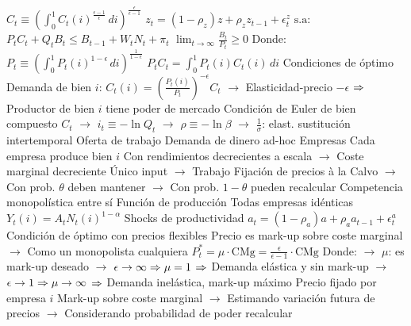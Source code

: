 \documentclass{nuevotema}
\begin{document}
\begin{esquemal}
				\4[] \quad \quad \quad $C_t \equiv \left( \int_0^1 C_t(i)^{\frac{\epsilon-1}{\epsilon}} \, di \right)^{\frac{\epsilon}{\epsilon-1}}$
				\4[] \quad \quad \quad $z_t = (1-\rho_z) z + \rho_z z_{t-1} + \epsilon_{t}^z$
				\4[] $\text{s.a:}$
				\4[] \quad \quad \quad $P_t C_t + Q_t B_t \leq B_{t-1} + W_t N_t + \pi_t$
				\4[] \quad \quad \quad $\lim_{t \to \infty} \frac{B_t}{P_t} \geq 0$
				\4[] Donde:
				\4[] \quad \quad \quad $P_t \equiv \left( \int_0^1 P_t(i)^{1-\epsilon} \, di \right)^{\frac{1}{1-\epsilon}}$
				\4[] \quad \quad \quad $P_t C_t = \int_0^1 P_t(i) C_t(i) \, di$
				\4 Condiciones de óptimo
				\4[] Demanda de bien $i$:
				\4[] $C_t(i) = \left( \frac{P_t(i)}{P_t} \right)^{-\epsilon} C_t$
				\4[] $\to$ Elasticidad-precio $-\epsilon$
				\4[] $\Rightarrow$ Productor de bien $i$ tiene poder de mercado
				\4[] Condición de Euler de bien compuesto $C_t$
				\4[] 
				\4[] $\to$ $i_t \equiv -\ln Q_t$
				\4[] $\to$ $\rho \equiv -\ln \beta$
				\4[] $\to$ $\frac{1}{\sigma}$: elast. sustitución intertemporal
				\4[] Oferta de trabajo
				\4[] 
				\4[] Demanda de dinero ad-hoc
				\4[] 
			\3 Empresas
				\4 Cada empresa produce bien $i$
				\4[] Con rendimientos decrecientes a escala
				\4[] $\to$ Coste marginal decreciente
				\4[] Único input
				\4[] $\to$ Trabajo
				\4[] Fijación de precios à la Calvo
				\4[] $\to$ Con prob. $\theta$ deben mantener
				\4[] $\to$ Con prob. $1-\theta$ pueden recalcular
				\4[] Competencia monopolística entre sí
				\4 Función de producción
				\4[] Todas empresas idénticas
				\4[] $Y_t(i) = A_t N_t(i)^{1-\alpha}$
				\4 Shocks de productividad
				\4[] $a_t = (1-\rho_a) a + \rho_a a_{t-1} + \epsilon_t^a$
				\4 Condición de óptimo con precios flexibles
				\4[] Precio es mark-up sobre coste marginal
				\4[] $\to$ Como un monopolista cualquiera
				\4[] $P^*_t = \mu \cdot \text{CMg} = \frac{\epsilon}{\epsilon-1} \cdot \text{CMg}$
				\4[] Donde:
				\4[] $\to$ $\mu$: es mark-up deseado
				\4[] $\to$ $\epsilon \to \infty \Rightarrow \mu = 1$
				\4[] $\Rightarrow$ Demanda elástica y sin mark-up
				\4[] $\to$ $\epsilon \to 1 \Rightarrow \mu \to \infty$
				\4[] $\Rightarrow$ Demanda inelástica, mark-up máximo
				\4 Precio fijado por empresa $i$
				\4[] Mark-up sobre coste marginal
				\4[] $\to$ Estimando variación futura de precios
				\4[] $\to$ Considerando probabilidad de poder recalcular

\end{esquemal}
\end{document}
